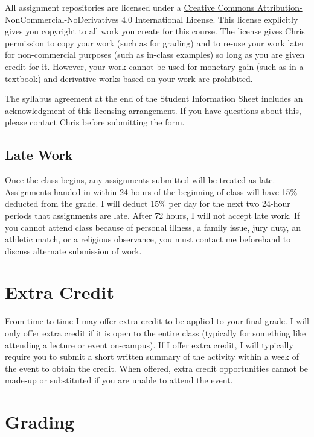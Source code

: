 \documentclass[
]{book}
\begin{document}
All assignment repositories are licensed under a \href{https://creativecommons.org/licenses/by-nc-nd/4.0/}{Creative Commons Attribution-NonCommercial-NoDerivatives 4.0 International License}. This license explicitly gives you copyright to all work you create for this course. The license gives Chris permission to copy your work (such as for grading) and to re-use your work later for non-commercial purposes (such as in-class examples) so long as you are given credit for it. However, your work cannot be used for monetary gain (such as in a textbook) and derivative works based on your work are prohibited.

The syllabus agreement at the end of the Student Information Sheet includes an acknowledgment of this licensing arrangement. If you have questions about this, please contact Chris before submitting the form.

\hypertarget{late-work}{%
\subsection{Late Work}\label{late-work}}

Once the class begins, any assignments submitted will be treated as late. Assignments handed in within 24-hours of the beginning of class will have 15\% deducted from the grade. I will deduct 15\% per day for the next two 24-hour periods that assignments are late. After 72 hours, I will not accept late work. If you cannot attend class because of personal illness, a family issue, jury duty, an athletic match, or a religious observance, you must contact me beforehand to discuss alternate submission of work.

\hypertarget{extra-credit}{%
\section{Extra Credit}\label{extra-credit}}

From time to time I may offer extra credit to be applied to your final grade. I will only offer extra credit if it is open to the entire class (typically for something like attending a lecture or event on-campus). If I offer extra credit, I will typically require you to submit a short written summary of the activity within a week of the event to obtain the credit. When offered, extra credit opportunities cannot be made-up or substituted if you are unable to attend the event.

\hypertarget{grading}{%
\section{Grading}\label{grading}}
\end{document}
